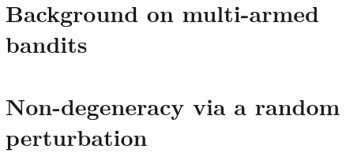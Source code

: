 \documentclass[11pt]{article}
\begin{document}

\begin{small}

\end{small}

\appendix

\section{Background on multi-armed bandits}
\label{app:examples}


\section{Non-degeneracy via a random perturbation}
\label{app:perturb}

\end{document}
